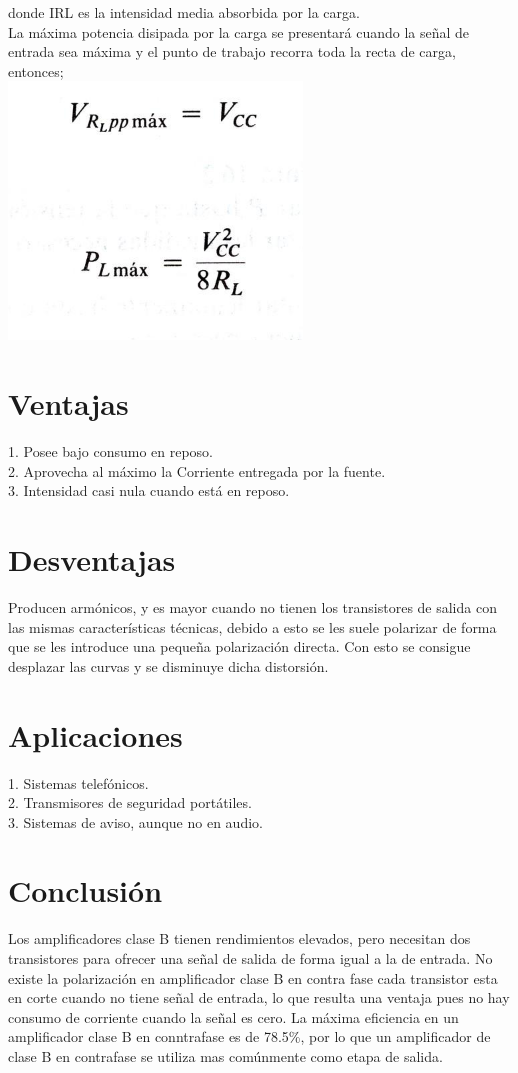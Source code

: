 \documentclass[10pt,a4paper]{article}
\begin{document}
\raggedright
donde IRL es la intensidad media absorbida por la carga.\\
La máxima potencia disipada por la carga se presentará cuando la señal de entrada sea máxima y el punto de trabajo recorra toda la recta de carga, entonces;\\
\centering
\includegraphics[scale=.60]{Vr.png}\\
\raggedright
\section{Ventajas}
1. Posee bajo consumo en reposo.\\
2. Aprovecha al máximo la Corriente entregada por la fuente.\\
3. Intensidad casi nula cuando está en reposo.\\
\section{Desventajas}
Producen armónicos, y es mayor cuando no tienen los transistores de salida con las mismas características técnicas, debido a esto se les suele polarizar de forma que se les introduce una pequeña polarización directa. Con esto se consigue desplazar las curvas y se disminuye dicha distorsión.
\section{Aplicaciones}
1. Sistemas telefónicos.\\
2. Transmisores de seguridad portátiles.\\
3. Sistemas de aviso, aunque no en audio.\\
\section{Conclusión}
Los amplificadores clase B tienen rendimientos elevados, pero necesitan dos transistores para ofrecer una señal de salida de forma igual a la de entrada. No existe la polarización en amplificador clase B en contra fase cada transistor esta en corte cuando no tiene señal de entrada, lo que resulta una ventaja pues no hay consumo de corriente cuando la señal es cero. La máxima eficiencia en un amplificador clase B en conntrafase es de 78.5\%, por lo que un amplificador de clase B en contrafase se utiliza mas comúnmente como etapa de salida.\\ 
\end{document}
